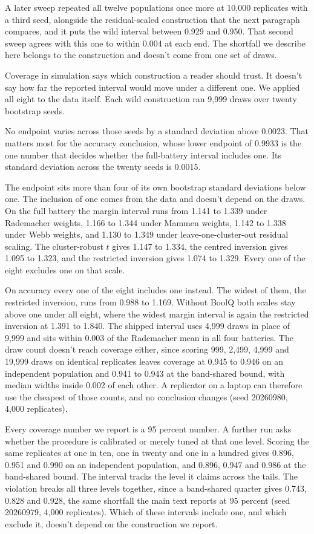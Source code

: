 A later sweep repeated all twelve populations once more at 10,000 replicates with a third seed, alongside the residual-scaled construction that the next paragraph compares, and it puts the wild interval between 0.929 and 0.950. That second sweep agrees with this one to within 0.004 at each end. The shortfall we describe here belongs to the construction and doesn't come from one set of draws.

Coverage in simulation says which construction a reader should trust. It doesn't say how far the reported interval would move under a different one. We applied all eight to the data itself. Each wild construction ran 9,999 draws over twenty bootstrap seeds.

No endpoint varies across those seeds by a standard deviation above 0.0023. That matters most for the accuracy conclusion, whose lower endpoint of 0.9933 is the one number that decides whether the full-battery interval includes one. Its standard deviation across the twenty seeds is 0.0015.

The endpoint sits more than four of its own bootstrap standard deviations below one. The inclusion of one comes from the data and doesn't depend on the draws. On the full battery the margin interval runs from 1.141 to 1.339 under Rademacher weights, 1.166 to 1.344 under Mammen weights, 1.142 to 1.338 under Webb weights, and 1.130 to 1.349 under leave-one-cluster-out residual scaling. The cluster-robust $t$ gives 1.147 to 1.334, the centred inversion gives 1.095 to 1.323, and the restricted inversion gives 1.074 to 1.329. Every one of the eight excludes one on that scale.

On accuracy every one of the eight includes one instead. The widest of them, the restricted inversion, runs from 0.988 to 1.169. Without BoolQ both scales stay above one under all eight, where the widest margin interval is again the restricted inversion at 1.391 to 1.840. The shipped interval uses 4,999 draws in place of 9,999 and sits within 0.003 of the Rademacher mean in all four batteries. The draw count doesn't reach coverage either, since scoring 999, 2,499, 4,999 and 19,999 draws on identical replicates leaves coverage at 0.945 to 0.946 on an independent population and 0.941 to 0.943 at the band-shared bound, with median widths inside 0.002 of each other. A replicator on a laptop can therefore use the cheapest of those counts, and no conclusion changes (seed 20260980, 4,000 replicates).

Every coverage number we report is a 95 percent number. A further run asks whether the procedure is calibrated or merely tuned at that one level. Scoring the same replicates at one in ten, one in twenty and one in a hundred gives 0.896, 0.951 and 0.990 on an independent population, and 0.896, 0.947 and 0.986 at the band-shared bound. The interval tracks the level it claims across the tails. The violation breaks all three levels together, since a band-shared quarter gives 0.743, 0.828 and 0.928, the same shortfall the main text reports at 95 percent (seed 20260979, 4,000 replicates). Which of these intervals include one, and which exclude it, doesn't depend on the construction we report.

